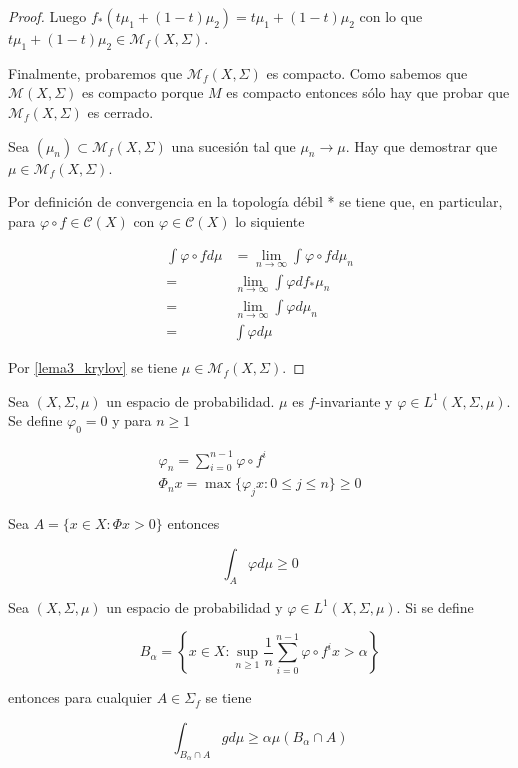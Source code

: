 \begin{proof}
	Luego $f_*(t\mu_1 + (1-t)\mu_2) = t\mu_1 + (1-t)\mu_2$ con lo que $t\mu_1 + (1-t)\mu_2 \in \mathcal{M}_f(X,\Sigma)$.
	
	Finalmente, probaremos que $\mathcal{M}_f(X,\Sigma)$ es compacto. Como sabemos que $\mathcal{M}(X,\Sigma)$ es compacto porque $M$ es compacto entonces sólo hay que probar que $\mathcal{M}_f(X,\Sigma)$ es cerrado.
	
	Sea $(\mu_n) \subset \mathcal{M}_f(X,\Sigma)$ una sucesión tal que $\mu_n \rightarrow \mu$. Hay que demostrar que $\mu \in \mathcal{M}_f(X,\Sigma)$.
	
	Por definición de convergencia en la topología débil * se tiene que, en particular, para $\varphi \circ f \in \mathcal{C}(X)$ con $\varphi \in \mathcal{C}(X)$ lo siquiente
	
	\begin{align}
	\int \varphi \circ f d\mu &= \lim_{n \rightarrow \infty} \int \varphi \circ f d\mu_n\\
	=& \lim_{n \rightarrow \infty} \int \varphi df_*\mu_n\\
	=& \lim_{n \rightarrow \infty} \int \varphi d\mu_n\\
	=& \int \varphi d\mu
	\end{align}
	
	Por \ref{lema3_krylov} se tiene $\mu \in \mathcal{M}_f(X,\Sigma)$.
\end{proof}

\begin{teorema}
	Sea $(X,\Sigma,\mu)$ un espacio de probabilidad. $\mu$ es $f$-invariante y $\varphi \in L^1(X,\Sigma,\mu)$. Se define $\varphi_0 = 0$ y para $n \geq 1$
	
	\begin{gather}
		\varphi_n = \sum_{i=0}^{n-1} \varphi \circ f^i\\
		\varPhi_n x = \max \{\varphi_j x : 0 \leq j \leq n\} \geq 0
	\end{gather}
	
	Sea $A = \{x \in X: \varPhi x > 0 \}$ entonces

	\begin{equation}
		\int_A \varphi d\mu \geq 0
	\end{equation}
\end{teorema}

\begin{corolario}\label{maxima_desigualdad_cor}
	Sea $(X,\Sigma,\mu)$ un espacio de probabilidad y $\varphi \in L^1(X,\Sigma,\mu)$. Si se define
	
	\begin{equation}
		B_{\alpha} = \left\{ x \in X: \sup_{n \geq 1} \frac{1}{n} \sum_{i=0}^{n-1} \varphi \circ f^i x > \alpha \right\}
	\end{equation}
	
	entonces para cualquier $A \in \Sigma_f$ se tiene
	
	\begin{equation}
		\int_{B_{\alpha} \cap A} g d\mu \geq \alpha \mu(B_{\alpha} \cap A)
	\end{equation}
\end{corolario}

